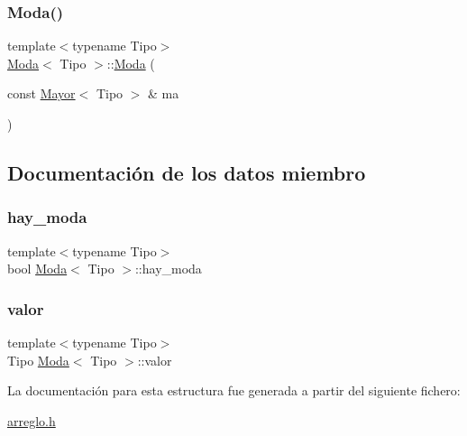 \subsubsection{\texorpdfstring{Moda()}{Moda()}}
{\footnotesize\ttfamily template$<$typename Tipo$>$ \\
\hyperlink{struct_moda}{Moda}$<$ Tipo $>$\+::\hyperlink{struct_moda}{Moda} (\begin{DoxyParamCaption}\item[{const \hyperlink{struct_mayor}{Mayor}$<$ Tipo $>$ \&}]{ma }\end{DoxyParamCaption})\hspace{0.3cm}{\ttfamily [inline]}}



\subsection{Documentación de los datos miembro}
\mbox{\label{struct_moda_ac79b25a802593339293054d788beef70}} 
\subsubsection{\texorpdfstring{hay\+\_\+moda}{hay\_moda}}
{\footnotesize\ttfamily template$<$typename Tipo$>$ \\
bool \hyperlink{struct_moda}{Moda}$<$ Tipo $>$\+::hay\+\_\+moda}

\mbox{\label{struct_moda_a5b1e37f7ab23196b577cfd4401717a7c}} 
\subsubsection{\texorpdfstring{valor}{valor}}
{\footnotesize\ttfamily template$<$typename Tipo$>$ \\
Tipo \hyperlink{struct_moda}{Moda}$<$ Tipo $>$\+::valor}



La documentación para esta estructura fue generada a partir del siguiente fichero\+:\begin{DoxyCompactItemize}
\item 
\hyperlink{arreglo_8h}{arreglo.\+h}\end{DoxyCompactItemize}
